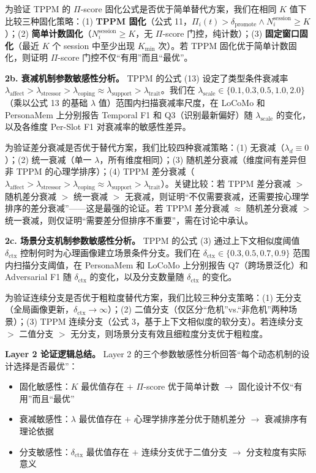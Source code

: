 \documentclass[12pt,a4paper]{article}
\begin{document}
为验证 TPPM 的 $\Pi$-score 固化公式是否优于简单替代方案，我们在相同 $K$ 值下比较三种固化策略：(1) \textbf{TPPM 固化}（公式 11，$\Pi_i(t) > \delta_{\text{promote}} \wedge N^{\text{session}}_i \geq K$）；(2) \textbf{简单计数固化}（$N^{\text{session}}_i \geq K$，无 $\Pi$-score 门控，纯计数）；(3) \textbf{固定窗口固化}（最近 $K$ 个 session 中至少出现 $K_{\min}$ 次）。若 TPPM 固化优于简单计数固化，则证明 $\Pi$-score 门控不仅``有用''而且``最优''。

\textbf{2b. 衰减机制参数敏感性分析。}
TPPM 的公式 (13) 设定了类型条件衰减率 $\lambda_{\text{affect}} > \lambda_{\text{stressor}} > \lambda_{\text{coping}} \approx \lambda_{\text{support}} > \lambda_{\text{trait}}$。我们在 $\lambda_{\text{scale}} \in \{0.1, 0.3, 0.5, 1.0, 2.0\}$（乘以公式 13 的基础 $\lambda$ 值）范围内扫描衰减率尺度，在 LoCoMo 和 PersonaMem 上分别报告 Temporal F1 和 Q3（识别最新偏好）随 $\lambda_{\text{scale}}$ 的变化，以及各维度 Per-Slot F1 对衰减率的敏感性差异。

为验证差分衰减是否优于替代方案，我们比较四种衰减策略：(1) 无衰减（$\lambda_d \equiv 0$）；(2) 统一衰减（单一 $\lambda$，所有维度相同）；(3) 随机差分衰减（维度间有差异但非 TPPM 的心理学排序）；(4) TPPM 差分衰减（$\lambda_{\text{affect}} > \lambda_{\text{stressor}} > \lambda_{\text{coping}} \approx \lambda_{\text{support}} > \lambda_{\text{trait}}$）。关键比较：若 TPPM 差分衰减 $>$ 随机差分衰减 $>$ 统一衰减 $>$ 无衰减，则证明``不仅需要衰减，还需要按心理学排序的差分衰减''——这是最强的论证。若 TPPM 差分衰减 $\approx$ 随机差分衰减 $>$ 统一衰减，则仅证明``需要差分但排序不重要''，需在讨论中承认。

\textbf{2c. 场景分支机制参数敏感性分析。}
TPPM 的公式 (3) 通过上下文相似度阈值 $\delta_{\text{ctx}}$ 控制何时为心理画像建立场景条件分支。我们在 $\delta_{\text{ctx}} \in \{0.3, 0.5, 0.7, 0.9\}$ 范围内扫描分支阈值，在 PersonaMem 和 LoCoMo 上分别报告 Q7（跨场景泛化）和 Adversarial F1 随 $\delta_{\text{ctx}}$ 的变化，以及分支数量随 $\delta_{\text{ctx}}$ 的变化。

为验证连续分支是否优于粗粒度替代方案，我们比较三种分支策略：(1) 无分支（全局画像更新，$\delta_{\text{ctx}} \to \infty$）；(2) 二值分支（仅区分``危机''vs.``非危机''两种场景）；(3) TPPM 连续分支（公式 3，基于上下文相似度的软分支）。若连续分支 $>$ 二值分支 $>$ 无分支，则场景分支有效且细粒度分支优于粗粒度。

\textbf{Layer 2 论证逻辑总结。}
Layer 2 的三个参数敏感性分析回答``每个动态机制的设计选择是否最优''：
\begin{itemize}
  \item 固化敏感性：$K$ 最优值存在 $+$ $\Pi$-score 优于简单计数 $\to$ 固化设计不仅``有用''而且``最优''
  \item 衰减敏感性：$\lambda$ 最优值存在 $+$ 心理学排序差分优于随机差分 $\to$ 衰减排序有理论依据
  \item 分支敏感性：$\delta_{\text{ctx}}$ 最优值存在 $+$ 连续分支优于二值分支 $\to$ 分支粒度有实际意义
\end{itemize}
\end{document}
